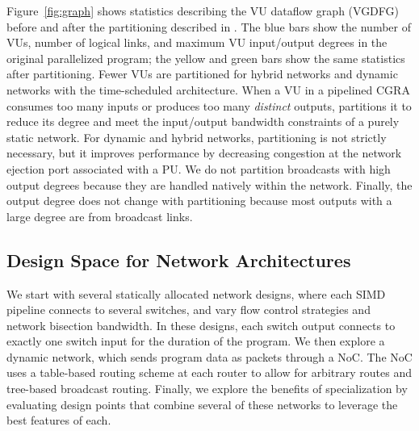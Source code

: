 Figure~\ref{fig:graph} shows statistics describing the VU dataflow graph (VGDFG) before and after
the partitioning described in . 
The blue bars show the number of VUs, number of logical links, and maximum VU input/output degrees in the original parallelized program; the yellow and green bars show the same statistics after partitioning. 
Fewer VUs are partitioned for hybrid networks and dynamic networks with the time-scheduled
architecture.
When a VU in a pipelined CGRA consumes too many inputs or produces too many \emph{distinct} outputs,
\name partitions it to reduce its degree and meet the input/output bandwidth constraints of a purely static network. 
For dynamic and hybrid networks, partitioning is not strictly necessary, but it improves performance
by decreasing congestion at the network ejection port associated with a PU.
We do not partition broadcasts with high output degrees because they are handled natively within the network. 
Finally, the output degree does not change with partitioning because most outputs with a large degree are from broadcast links.

\subsection{Design Space for Network Architectures} \label{sec:network}

We start with several statically allocated network designs, where each SIMD pipeline connects to several switches, and vary flow control strategies and network bisection bandwidth.
In these designs, each switch output connects to exactly one switch input for the duration of the program.
We then explore a dynamic network, which sends program data as packets through a NoC.
The NoC uses a table-based routing scheme at each router to allow for arbitrary routes and tree-based broadcast routing.
Finally, we explore the benefits of specialization by evaluating design points that combine several of these networks to leverage the best features of each.

